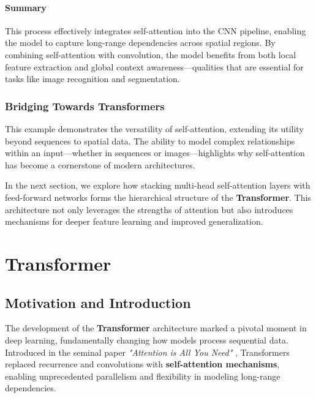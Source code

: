 \paragraph{Summary}

\noindent This process effectively integrates self-attention into the CNN pipeline, enabling the model to capture long-range dependencies across spatial regions. By combining self-attention with convolution, the model benefits from both local feature extraction and global context awareness—qualities that are essential for tasks like image recognition and segmentation.

\subsubsection{Bridging Towards Transformers}

\noindent This example demonstrates the versatility of self-attention, extending its utility beyond sequences to spatial data. The ability to model complex relationships within an input—whether in sequences or images—highlights why self-attention has become a cornerstone of modern architectures. 

\noindent In the next section, we explore how stacking multi-head self-attention layers with feed-forward networks forms the hierarchical structure of the \textbf{Transformer}. This architecture not only leverages the strengths of attention but also introduces mechanisms for deeper feature learning and improved generalization.

\newpage

\section{Transformer}

\subsection{Motivation and Introduction}
\label{subsec:chapter17_transformer_motivation}

\noindent The development of the \textbf{Transformer} architecture marked a pivotal moment in deep learning, fundamentally changing how models process sequential data. Introduced in the seminal paper \textit{"Attention is All You Need"} \cite{vaswani2017_attention}, Transformers replaced recurrence and convolutions with \textbf{self-attention mechanisms}, enabling unprecedented parallelism and flexibility in modeling long-range dependencies.

